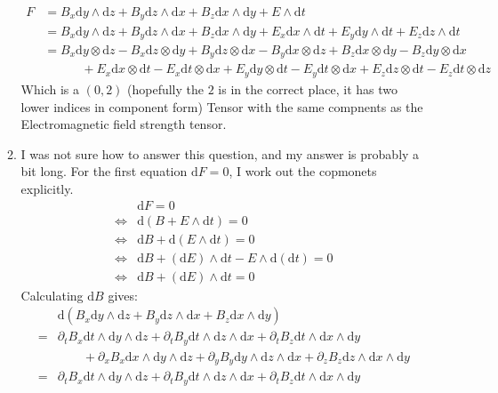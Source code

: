 \documentclass[12pt,a4]{article}
\newcommand{\e}{\mathrm{d}}
\begin{document}
\begin{enumerate}
\begin{enumerate}
        \begin{align*}
          F &= B_x \e y \wedge \e z + B_y \e z \wedge \e x + B_z \e x \wedge \e y + E \wedge \e t\\
            &= B_x \e y \wedge \e z + B_y \e z \wedge \e x + B_z \e x \wedge \e y + E_x \e x \wedge \e t  + E_y \e y \wedge \e t  + E_z \e z \wedge \e t\\
            &= B_x \e y \otimes \e z - B_x \e z \otimes \e y + B_y \e z \otimes \e x - B_y \e x \otimes \e z + B_z \e x \otimes \e y - B_z \e y \otimes \e x\\
            &\qquad \quad + E_x \e x \otimes \e t - E_x \e t \otimes \e x + E_y \e y \otimes \e t - E_y \e t \otimes \e x + E_z \e z \otimes \e t - E_z \e t \otimes \e z
        \end{align*}
        Which is a $(0,2)$ (hopefully the $2$ is in the correct place, it has two lower indices in component form) Tensor with the same compnents as the Electromagnetic field strength tensor.
      \item
        I was not sure how to answer this question, and my answer is probably a bit long.
        For the first equation $\e F = 0$, I work out the copmonets explicitly.
        \begin{align*}
                          &\e F = 0\\
          \Leftrightarrow &\e (B + E \wedge \e t) = 0\\
          \Leftrightarrow &\e B + \e (E \wedge \e t) = 0\\
          \Leftrightarrow &\e B + (\e E) \wedge \e t - E \wedge \e(\e t) = 0\\
          \Leftrightarrow &\e B + (\e E) \wedge \e t  = 0
        \end{align*}
        Calculating $\e B$ gives:
        \begin{align*}
            & \e(B_x \e y \wedge \e z + B_y \e z \wedge \e x + B_z \e x \wedge \e y) \\
          = & \partial_t B_x  \e t \wedge \e y \wedge \e z + \partial_t B_y  \e t \wedge \e z \wedge \e x + \partial_t B_z  \e t \wedge \e x \wedge \e y\\
            & \qquad + \partial_x B_x \e x \wedge \e y \wedge \e z + \partial_y B_y \e y \wedge \e z \wedge \e x  + \partial_z B_z \e z \wedge \e x \wedge \e y\\
          = & \partial_t B_x  \e t \wedge \e y \wedge \e z + \partial_t B_y  \e t \wedge \e z \wedge \e x + \partial_t B_z  \e t \wedge \e x \wedge \e y\\

\end{align*}
\end{enumerate}
\end{enumerate}
\end{document}
